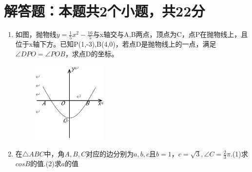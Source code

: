 \documentclass[12pt,twoside,space]{ctexart}
\begin{document}
\section{解答题：本题共2个小题，共22分}
\begin{enumerate}[itemsep=0.2em,topsep=0pt]
\item
如图，抛物线$ y=\frac{1}{5}x^2-\frac{16}{5} $与x轴交与A,B两点，顶点为C，点P在抛物线上，且位于x轴下方。已知P(1,-3),B(4,0)，若点D是抛物线上的一点，满足$ \angle DPO=\angle POB $，求点D的坐标。
\begin{figure}[H]
                      \centering
                      \includegraphics[width=10em]{288793-1632795205-2.jpg}
\end{figure}
\item
在$\triangle ABC$中，角$A,B,C$对应的边分别为$a,b,c$且$b=1，c=\sqrt{3},\angle C=\frac{2}{3}\pi.$(1)求$cosB$的值.(2)求$a$的值
\end{enumerate}

\clearpage
\end{document}
